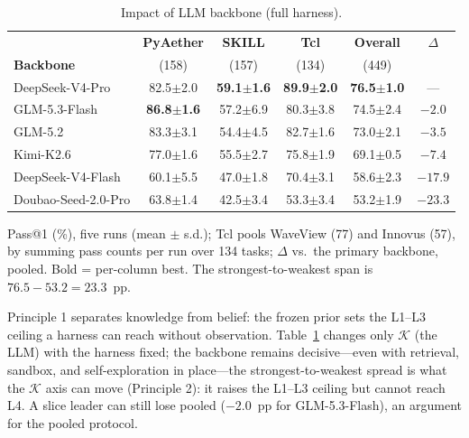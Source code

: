 \begin{table}[!t]
\centering
\caption{Impact of LLM backbone (full harness).}
\label{tab:llm-comparison}
\scriptsize
\renewcommand{\arraystretch}{0.76}
\setlength{\tabcolsep}{2.5pt}
\begin{tabular}{@{}lccccc@{}}
\toprule
 & \textbf{PyAether} & \textbf{SKILL} & \textbf{Tcl} & \textbf{Overall} & \textbf{$\Delta$} \\
\textbf{Backbone} & (158) & (157) & (134) & (449) & \\
\midrule
DeepSeek-V4-Pro & 82.5$\pm$2.0 & \textbf{59.1$\pm$1.6} & \textbf{89.9$\pm$2.0} & \textbf{76.5$\pm$1.0} & --- \\
GLM-5.3-Flash & \textbf{86.8$\pm$1.6} & 57.2$\pm$6.9 & 80.3$\pm$3.8 & 74.5$\pm$2.4 & $-2.0$ \\
GLM-5.2 & 83.3$\pm$3.1 & 54.4$\pm$4.5 & 82.7$\pm$1.6 & 73.0$\pm$2.1 & $-3.5$ \\
Kimi-K2.6 & 77.0$\pm$1.6 & 55.5$\pm$2.7 & 75.8$\pm$1.9 & 69.1$\pm$0.5 & $-7.4$ \\
DeepSeek-V4-Flash & 60.1$\pm$5.5 & 47.0$\pm$1.8 & 70.4$\pm$3.1 & 58.6$\pm$2.3 & $-17.9$ \\
Doubao-Seed-2.0-Pro & 63.8$\pm$1.4 & 42.5$\pm$3.4 & 53.3$\pm$3.4 & 53.2$\pm$1.9 & $-23.3$ \\
\bottomrule
\end{tabular}

\footnotesize{Pass@1 (\%), five runs (mean $\pm$ s.d.); Tcl pools WaveView (77) and Innovus (57), by summing pass counts per run over 134 tasks; $\Delta$ vs.\ the primary backbone, pooled. Bold = per-column best. The strongest-to-weakest span is $76.5-53.2=23.3$~pp.}
\end{table}

Principle 1 separates knowledge from belief: the frozen prior sets the L1--L3 ceiling a harness can reach without observation. Table~\ref{tab:llm-comparison} changes only $\mathcal{K}$ (the LLM) with the harness fixed; the backbone remains decisive---even with retrieval, sandbox, and self-exploration in place---the strongest-to-weakest spread is what the $\mathcal{K}$ axis can move (Principle 2): it raises the L1--L3 ceiling but cannot reach L4. A slice leader can still lose pooled ($-2.0$~pp for GLM-5.3-Flash), an argument for the pooled protocol.

